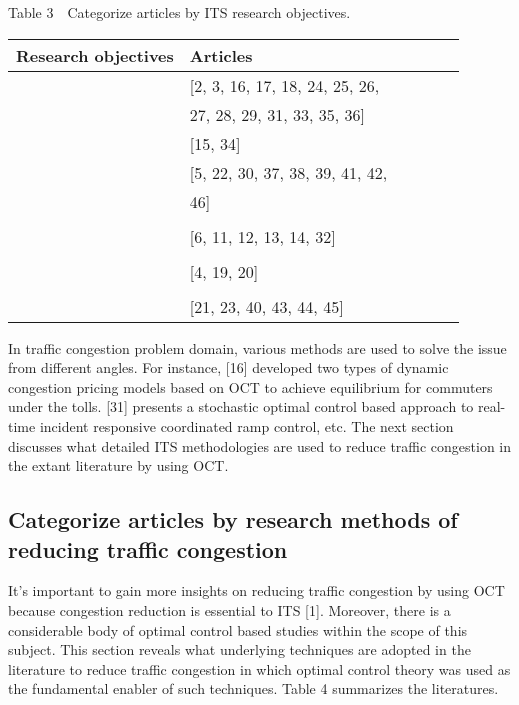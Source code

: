 \documentclass[12pt,onecolumn,twoside]{JCTA}
\theoremstyle{mystyle}
\begin{document}
\begin{center}
{Table 3~~Categorize articles by ITS research objectives.}\vskip 3pt
\small{\begin{tabular}{lll@{ }llc@{ }} \toprule
Research objectives & Articles \\\midrule
{}
& [2, 3, 16, 17, 18, 24, 25, 26,\\
& 27, 28, 29, 31, 33, 35, 36]\\
\hline 
{}
& [15, 34]\\ 
\hline 
{}
& [5, 22, 30, 37, 38, 39, 41, 42,\\
& 46] \\ \\
\hline 
{}
& [6, 11, 12, 13, 14, 32]\\ \\
\hline 
{}
& [4, 19, 20]\\ \\
\hline 
{}
& [21, 23, 40, 43, 44, 45]\\
\bottomrule
\end{tabular}}
\vskip 3pt
\end{center}

In traffic congestion problem domain, various methods are used to solve the issue from different angles. For instance, [16] developed two types of dynamic congestion pricing models based on OCT to achieve equilibrium for commuters under the tolls. [31] presents a stochastic optimal control based approach to real-time incident responsive coordinated ramp control, etc. The next section discusses what detailed ITS methodologies are used to reduce traffic congestion in the extant literature by using OCT.

\subsection{Categorize articles by research methods of reducing traffic congestion}
It{\textquoteright}s important to gain more insights on reducing traffic congestion by using OCT because congestion reduction is essential to ITS [1]. Moreover, there is a considerable body of optimal control based studies within the scope of this subject. This section reveals what underlying techniques are adopted in the literature to reduce traffic congestion in which optimal control theory was used as the fundamental enabler of such techniques. Table 4 summarizes the literatures.
\end{document}
